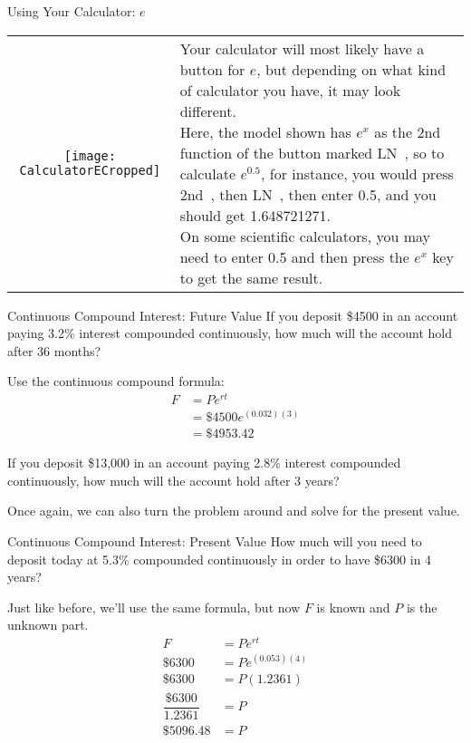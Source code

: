 \begin{proc}{Using Your Calculator: $e$}
\begin{tabular}{c l}
\texttt{[image: CalculatorECropped]} & \parbox[b]{3in}{Your calculator will most likely have a button for $e$, but depending on what kind of calculator you have, it may look different.\\

Here, the model shown has $e^x$ as the 2nd function of the button marked $\boxed{\textrm{LN}}$\ , so to calculate $e^{0.5}$, for instance, you would press $\boxed{\textrm{2nd}}$\ , then $\boxed{\textrm{LN}}$\ , then enter 0.5, and you should get 1.648721271.\\

On some scientific calculators, you may need to enter 0.5 and then press the $\boxed{e^x}$ key to get the same result.}
\end{tabular}
\end{proc}
\pagebreak

\begin{example}{Continuous Compound Interest: Future Value}
If you deposit \$4500 in an account paying 3.2\% interest compounded continuously, how much will the account hold after 36 months?

\sol
Use the continuous compound formula:
\begin{align*}
F &= Pe^{rt}\\
&= \$4500e^{(0.032)(3)}\\
&= \boxed{\$4953.42}
\end{align*}
\end{example}

\begin{try}
If you deposit \$13,000 in an account paying 2.8\% interest compounded continuously, how much will the account hold after 3 years?
\end{try}
\vfill

Once again, we can also turn the problem around and solve for the present value.
\vfill

\begin{example}{Continuous Compound Interest: Present Value}
How much will you need to deposit today at 5.3\% compounded continuously in order to have \$6300 in 4 years?

\sol
Just like before, we'll use the same formula, but now $F$ is known and $P$ is the unknown part.
\begin{align*}
F &= Pe^{rt}\\
\$6300 &= Pe^{(0.053)(4)}\\
\$6300 &= P(1.2361)\\
\dfrac{\$6300}{1.2361} &= P\\
\boxed{\$5096.48} &= P
\end{align*}
\end{example}
\vfill

